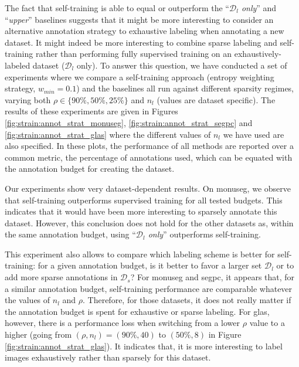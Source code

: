 The fact that self-training is able to equal or outperform the ``\textit{$\mathcal{D}_l$ only}'' and ``\textit{upper}'' baselines suggests that it might be more interesting to consider an alternative annotation strategy to exhaustive labeling when annotating a new dataset. %
It might indeed be more interesting to combine sparse labeling and self-training rather than performing fully supervised training on an exhaustively-labeled dataset (\ie $\mathcal{D}_l$ only). To answer this question, we have conducted a set of experiments where we compare a self-training approach (entropy weighting strategy, $w_{min} = 0.1$) and the baselines all run against different sparsity regimes, varying both $\rho \in \{90\%, 50\%, 25\%\}$ and $n_l$ (values are dataset specific). The results of these experiments are given in Figures \ref{fig:strain:annot_strat_monuseg}, \ref{fig:strain:annot_strat_segpc} and \ref{fig:strain:annot_strat_glas} where the different values of $n_l$ we have used are also specified. In these plots, the performance of all methods are reported over a common metric, the percentage of annotations used, which can be equated with the annotation budget for creating the dataset.

Our experiments show very dataset-dependent results. On \acrshort{monuseg}, we observe that self-training outperforms supervised training for all tested budgets. This indicates that it would have been more interesting to sparsely annotate this dataset. However, this conclusion does not hold for the other datasets as, within the same annotation budget, using ``\textit{$\mathcal{D}_l$ only}'' outperforms self-training.

This experiment also allows to compare which labeling scheme is better for self-training: for a given annotation budget, is it better to favor a larger set $\mathcal{D}_l$ or to add more sparse annotations in $\mathcal{D}_s$? For \acrshort{monuseg} and \acrshort{segpc}, it appears that, for a similar annotation budget, self-training performance are comparable whatever the values of $n_l$ and $\rho$. Therefore, for those datasets, it does not really matter if the annotation budget is spent for exhaustive or sparse labeling. For \acrshort{glas}, however, there is a performance loss when switching from a lower $\rho$ value to a higher (\eg going from $(\rho, n_l) = (90\%, 40)$ to $(50\%, 8)$ in Figure \ref{fig:strain:annot_strat_glas}). It indicates that, it is more interesting to label images exhaustively rather than sparsely for this dataset.

